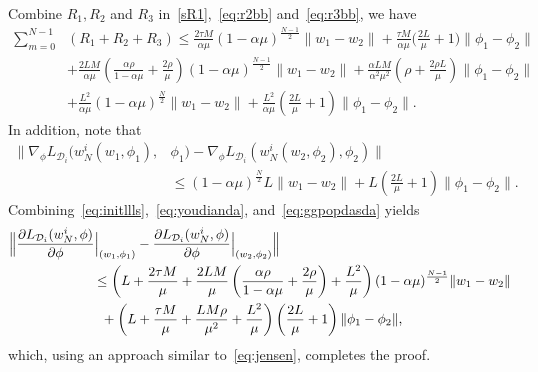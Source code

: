 \documentclass{osudissert96}
\begin{document}
Combine $R_1,R_2$ and $R_3$ in~\cref{sR1},~\cref{eq:r2bb} and~\cref{eq:r3bb}, we have
\begin{align}\label{eq:youdianda}
\sum_{m=0}^{N-1}&(R_1+R_2+R_3) \leq  \frac{2\tau M}{\alpha\mu}(1-\alpha\mu)^{\frac{N-1}{2}}  \|w_1-w_2\| + \frac{\tau M}{\alpha\mu}\Big(\frac{2L}{\mu}+1\Big) \|\phi_1-\phi_2\| \nonumber
\\ &+ \frac{2LM}{\alpha\mu} \left( \frac{\alpha\rho}{1-\alpha\mu}+\frac{2\rho}{\mu}\right)(1-\alpha\mu)^{\frac{N-1}{2}}\|w_1-w_2\| +\frac{\alpha LM}{\alpha^2\mu^2}\left( \rho+\frac{2\rho L}{\mu} \right)\|\phi_1-\phi_2\| \nonumber
\\&+\frac{L^2}{\alpha\mu} (1-\alpha\mu)^{\frac{N}{2}}\|w_1-w_2\| + \frac{L^2}{\alpha\mu}\left(\frac{2L}{\mu}+1\right)\|\phi_1-\phi_2\|.
\end{align}
In addition, note that 
\begin{align}\label{eq:ggpopdasda}
 \|\nabla_\phi L_{\mathcal{D}_i}(w_{N}^i(w_1,\phi_1),&\phi_1)-\nabla_\phi L_{\mathcal{D}_i}(w_{N}^i(w_2,\phi_2),\phi_2)\| \nonumber
 \\&\leq (1-\alpha\mu)^{\frac{N}{2}} L \|w_1-w_2\| +  L\left(\frac{2L}{\mu}+1\right)\|\phi_1-\phi_2\|.
 \end{align}
 Combining~\cref{eq:initllls},~\cref{eq:youdianda}, and~\cref{eq:ggpopdasda} yields
\begin{align}\label{eq:opissas}
\Big\|&\frac{\partial L_{\mathcal{D}_i}( w^i_N, \phi)}{\partial \phi}\Big |_{(w_1,\phi_1)}  - \frac{\partial L_{\mathcal{D}_i}( w^i_N, \phi)}{\partial \phi} \Big |_{(w_2,\phi_2)}\Big\| \nonumber
\\ &\hspace{2cm}\leq   \left(  L+\frac{2\tau M}{\mu}+ \frac{2LM}{\mu} \left( \frac{\alpha\rho}{1-\alpha\mu}+\frac{2\rho}{\mu}\right) +\frac{L^2}{\mu} \right)(1-\alpha\mu)^{\frac{N-1}{2}}\|w_1-w_2\| \nonumber
\\&\hspace{2.2cm}+ \left(L+\frac{\tau M}{\mu} + \frac{ LM\rho}{\mu^2}+\frac{L^2}{\mu} \right)\left(\frac{2L}{\mu}+1\right)\|\phi_1-\phi_2\|,
\end{align}
which, using an approach similar to~\cref{eq:jensen}, completes the proof. 
\end{document}
